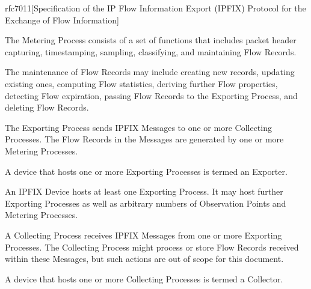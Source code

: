 \begin{displaycquote}{rfc7011}[Specification of the IP Flow Information Export (IPFIX) Protocol for the Exchange of Flow Information]
\begin{description}[style=nextline]
      The Metering Process consists of a set of functions that includes
      packet header capturing, timestamping, sampling, classifying, and
      maintaining Flow Records.

      The maintenance of Flow Records may include creating new records,
      updating existing ones, computing Flow statistics, deriving
      further Flow properties, detecting Flow expiration, passing Flow
      Records to the Exporting Process, and deleting Flow Records.
      
        \item[Exporting Process]
      The Exporting Process sends IPFIX Messages to one or more
      Collecting Processes.  The Flow Records in the Messages are
      generated by one or more Metering Processes.

        \item[Exporter]
      A device that hosts one or more Exporting Processes is termed an
      Exporter.

        \item[IPFIX Device]
      An IPFIX Device hosts at least one Exporting Process.  It may host
      further Exporting Processes as well as arbitrary numbers of
      Observation Points and Metering Processes.

        \item[Collecting Process]
      A Collecting Process receives IPFIX Messages from one or more
      Exporting Processes.  The Collecting Process might process or
      store Flow Records received within these Messages, but such
      actions are out of scope for this document.

        \item[Collector]
      A device that hosts one or more Collecting Processes is termed a
      Collector.
    \end{description}

\end{displaycquote}



